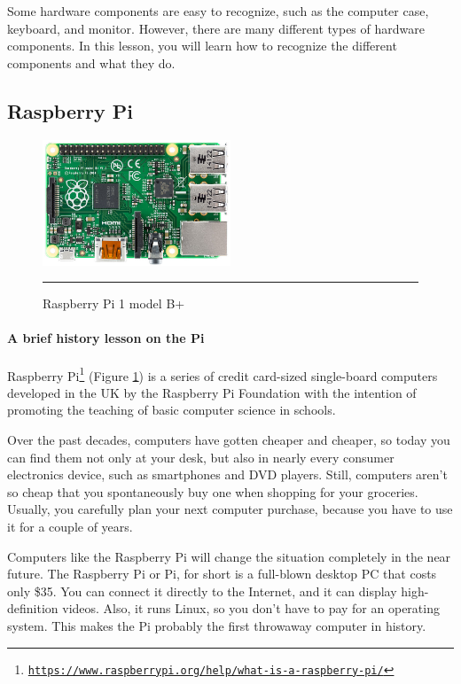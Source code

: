 Some hardware components are easy to recognize, such as the computer case, keyboard, and monitor. However, there are many different types of hardware components. In this lesson, you will learn how to recognize the different components and what they do.


\subsection{Raspberry Pi}
\begin{figure}
  \begin{center}
    \includegraphics[width=0.5\textwidth]{./Pictures/raspberry_pi_b.jpg}
  \end{center}
  \rule{0.5\textwidth}{0.5pt}
  \caption{Raspberry Pi 1 model B+}
  \label{fig:Raspberry}
\end{figure}
\paragraph*{A brief history lesson on the Pi}
\hfill \break
Raspberry Pi\footnote{\href{https://www.raspberrypi.org/help/what-is-a-raspberry-pi/}{\texttt{https://www.raspberrypi.org/help/what-is-a-raspberry-pi/}}} (Figure \ref{fig:Raspberry}) is a series of credit card-sized single-board computers developed in the UK by the Raspberry Pi Foundation with the intention of promoting the teaching of basic computer science in schools.

Over the past decades, computers have gotten cheaper and cheaper, so today
you can find them not only at your desk, but also in nearly every consumer
electronics device, such as smartphones and DVD players. Still, computers
aren’t so cheap that you spontaneously buy one when shopping for your
groceries. Usually, you carefully plan your next computer purchase, because
you have to use it for a couple of years.

Computers like the Raspberry Pi will change the situation completely in the
near future. The Raspberry Pi or Pi, for short is a full-blown desktop PC
that costs only \$35. You can connect it directly to the Internet, and it can
display high-definition videos. Also, it runs Linux, so you don’t have to pay
for an operating system. This makes the Pi probably the first throwaway
computer in history.

